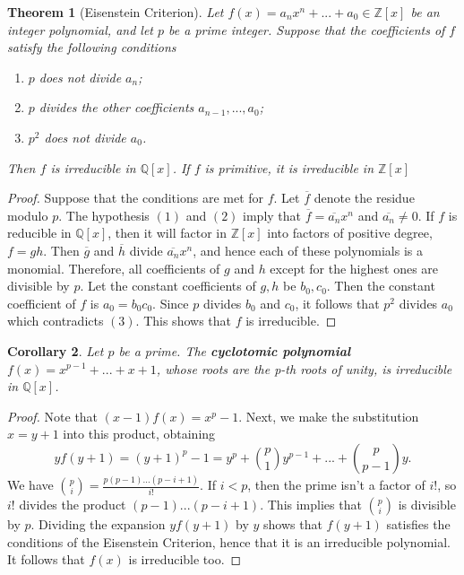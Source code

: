\documentclass[12pt]{article}
\newtheorem{thm}{Theorem}[section]
\newtheorem{cor}[thm]{Corollary}
\theoremstyle{definition}
\theoremstyle{remark}
\numberwithin{equation}{section}
\newcommand\Z{\mathbb Z}    %
\newcommand\Q{\mathbb Q}    %
\newcommand\B[1]{\textbf{ #1}}
\begin{document}
\vspace{15pt}

\begin{thm}[Eisenstein Criterion]
        Let $f(x) = a_nx^n + ... + a_0 \in \Z[x]$ be an integer polynomial, and let $p$ be a prime integer. Suppose that the coefficients of $f$ satisfy the following conditions \begin{enumerate}
                \item $p$ does not divide $a_n$;
                \item $p$ divides the other coefficients $a_{n-1},...,a_0$;
                \item $p^2$ does not divide $a_0$.
        \end{enumerate}
        Then $f$ is irreducible in $\Q[x]$. If $f$ is primitive, it is irreducible in $\Z[x]$
\end{thm}
\begin{proof}
        Suppose that the conditions are met for $f$. Let $\overline{f}$ denote the residue modulo $p$. The hypothesis $(1)$ and $(2)$ imply that $\overline{f} = \overline{a_n}x^n$ and $\overline{a_n} \neq 0$. If $f$ is reducible in $\Q[x]$, then it will factor in $\Z[x]$ into factors of positive degree, $f=gh$. Then $\overline{g}$ and $\overline{h}$ divide $\overline{a_n}x^n$, and hence each of these polynomials is a monomial. Therefore, all coefficients of $g$ and $h$ except for the highest ones are divisible by $p$. Let the constant coefficients of $g,h$ be $b_0,c_0$. Then the constant coefficient of $f$ is $a_0 = b_0c_0$. Since $p$ divides $b_0$ and $c_0$, it follows that $p^2$ divides $a_0$ which contradicts $(3)$. This shows that $f$ is irreducible.
\end{proof}

\vspace{15pt}

\begin{cor}
        Let $p$ be a prime. The \B{cyclotomic polynomial} $f(x) = x^{p-1}+...+x+1$, whose roots are the p-th roots of unity, is irreducible in $\Q[x]$.
\end{cor}
\begin{proof}
        Note that $(x-1)f(x) = x^p - 1$. Next, we make the substitution $x=y+1$ into this product, obtaining \begin{equation}
                yf(y+1) = (y+1)^p - 1 =y^p + \binom{p}{1}y^{p-1} + ... + \binom{p}{p-1}y.
        \end{equation}
        We have $\binom{p}{i} = \frac{p(p-1)...(p-i+1)}{i!}$. If $i < p$, then the prime isn't a factor of $i!$, so $i!$ divides the product $(p-1)...(p-i+1)$. This implies that $\binom{p}{i}$ is divisible by $p$. Dividing the expansion $yf(y+1)$ by $y$ shows that $f(y+1)$ satisfies the conditions of the Eisenstein Criterion, hence that it is an irreducible polynomial. It follows that $f(x)$ is irreducible too.
\end{proof}
\end{document}
